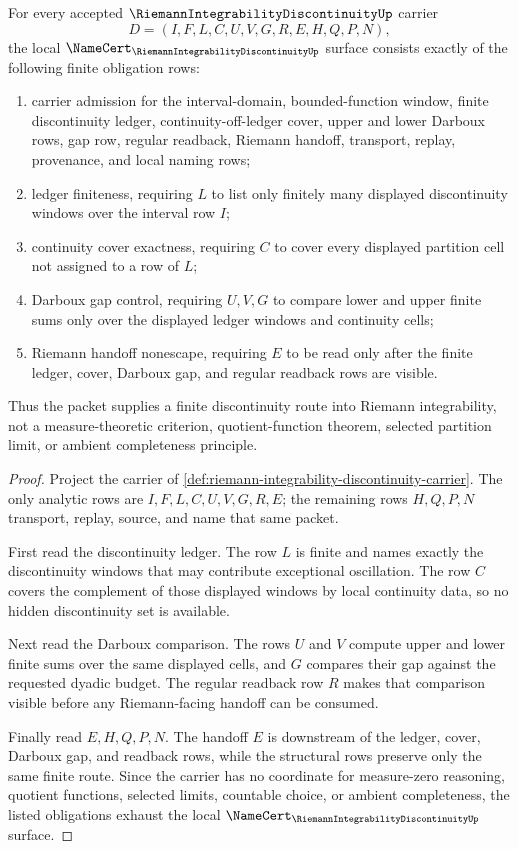 \begin{theorem}
\label{thm:riemann-integrability-discontinuity-namecert-obligations}
For every accepted $\RiemannIntegrabilityDiscontinuityUp$ carrier
$$
D=(I,F,L,C,U,V,G,R,E,H,Q,P,N),
$$
the local $\NameCert_{\RiemannIntegrabilityDiscontinuityUp}$ surface consists exactly of the following finite obligation rows:
\begin{enumerate}
\item carrier admission for the interval-domain, bounded-function window, finite discontinuity ledger, continuity-off-ledger cover, upper and lower Darboux rows, gap row, regular readback, Riemann handoff, transport, replay, provenance, and local naming rows;
\item ledger finiteness, requiring $L$ to list only finitely many displayed discontinuity windows over the interval row $I$;
\item continuity cover exactness, requiring $C$ to cover every displayed partition cell not assigned to a row of $L$;
\item Darboux gap control, requiring $U,V,G$ to compare lower and upper finite sums only over the displayed ledger windows and continuity cells;
\item Riemann handoff nonescape, requiring $E$ to be read only after the finite ledger, cover, Darboux gap, and regular readback rows are visible.
\end{enumerate}
Thus the packet supplies a finite discontinuity route into Riemann integrability, not a measure-theoretic criterion, quotient-function theorem, selected partition limit, or ambient completeness principle.
\end{theorem}
\begin{proof}
Project the carrier of \autoref{def:riemann-integrability-discontinuity-carrier}. The only analytic rows are $I,F,L,C,U,V,G,R,E$; the remaining rows $H,Q,P,N$ transport, replay, source, and name that same packet.

First read the discontinuity ledger. The row $L$ is finite and names exactly the discontinuity windows that may contribute exceptional oscillation. The row $C$ covers the complement of those displayed windows by local continuity data, so no hidden discontinuity set is available.

Next read the Darboux comparison. The rows $U$ and $V$ compute upper and lower finite sums over the same displayed cells, and $G$ compares their gap against the requested dyadic budget. The regular readback row $R$ makes that comparison visible before any Riemann-facing handoff can be consumed.

Finally read $E,H,Q,P,N$. The handoff $E$ is downstream of the ledger, cover, Darboux gap, and readback rows, while the structural rows preserve only the same finite route. Since the carrier has no coordinate for measure-zero reasoning, quotient functions, selected limits, countable choice, or ambient completeness, the listed obligations exhaust the local $\NameCert_{\RiemannIntegrabilityDiscontinuityUp}$ surface.
\end{proof}

